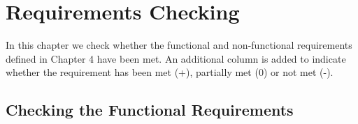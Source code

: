 \chapter{Requirements Checking}

\label{chap:check_req}

In this chapter we check whether the functional and non-functional requirements defined in Chapter 4 have been met. An additional column is added to indicate whether the requirement has been met (+), partially met (0) or not met (-).

\section{Checking the Functional Requirements}

\label{seq:check_func_req}

